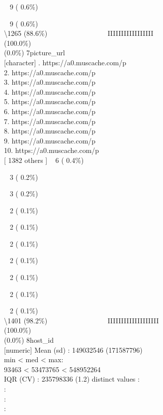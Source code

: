 \documentclass[
  journal,
]{IEEEtran}%
\begin{document}
\strut ~ 9 ( 0.6\%)\\
\strut ~ 9 ( 0.6\%)\\
\textbackslash1265 (88.6\%) \textbar{} \textbar~ ~ ~ ~ ~ ~ ~ ~ ~ ~
IIIIIIIIIIIIIIIII \\
(100.0\%) \\
(0.0\%) \textbar{} \textbar{} 7\textbar picture\_url\\
{[}character{]} . https://a0.muscache.com/p\\
2. https://a0.muscache.com/p\\
3. https://a0.muscache.com/p\\
4. https://a0.muscache.com/p\\
5. https://a0.muscache.com/p\\
6. https://a0.muscache.com/p\\
7. https://a0.muscache.com/p\\
8. https://a0.muscache.com/p\\
9. https://a0.muscache.com/p\\
10. https://a0.muscache.com/p\\
{[} 1382 others {]} \textbar~ 6 ( 0.4\%)\\
\strut ~ 3 ( 0.2\%)\\
\strut ~ 3 ( 0.2\%)\\
\strut ~ 2 ( 0.1\%)\\
\strut ~ 2 ( 0.1\%)\\
\strut ~ 2 ( 0.1\%)\\
\strut ~ 2 ( 0.1\%)\\
\strut ~ 2 ( 0.1\%)\\
\strut ~ 2 ( 0.1\%)\\
\strut ~ 2 ( 0.1\%)\\
\textbackslash1401 (98.2\%) \textbar{} \textbar~ ~ ~ ~ ~ ~ ~ ~ ~ ~
IIIIIIIIIIIIIIIIIII \\
(100.0\%) \\
(0.0\%) \textbar{} \textbar{} 8\textbar host\_id\\
{[}numeric{]} \textbar Mean (sd) : 149032546 (171587796)\\
min \textless{} med \textless{} max:\\
93463 \textless{} 53473765 \textless{} 548952264\\
IQR (CV) : 235798336 (1.2)  distinct values \textbar{}
\textbar:\\
:\\
:\\
:\\
\end{document}
